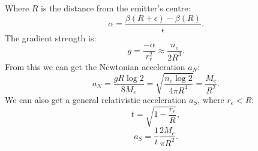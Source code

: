 \documentclass[12pt]{article}
\begin{document}
Where $R$ is the distance from the emitter's centre:
\begin{equation}
\alpha = \frac{\beta(R + \epsilon) - \beta(R)}{\epsilon}.
\end{equation}
The gradient strength is:
\begin{equation}
g = \frac{-\alpha}{r_{r}^2} \approx \frac{n_e}{2 R^3}.
\end{equation}
From this we can get the Newtonian acceleration $a_N$:
\begin{equation}
a_N =\frac{g R \log 2}{8 M_{e}} =  \sqrt{\frac{n_e \log 2}{4 \pi R^4}} = \frac{M_{e}}{R^2}.
\end{equation}
We can also get a general relativistic acceleration $a_S$, where $r_e < R$:
\begin{equation}
t = \sqrt{1 - \frac{r_e}{R}},
\end{equation}
\begin{equation}
a_S = \frac{1}{t} \frac{2 M_e}{\pi R^2}.
\end{equation}
\end{document}
